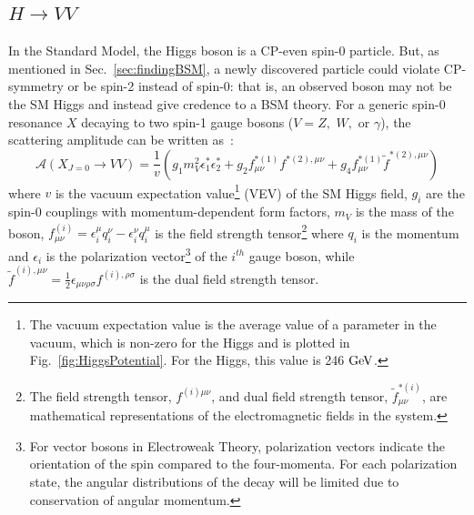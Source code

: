 \subsection{$H\rightarrow VV$}
\label{sec:HVVDecay}

In the Standard Model, the Higgs boson is a CP-even spin-0 particle. But, as mentioned in Sec.~\ref{sec:findingBSM}, a newly discovered particle could violate CP-symmetry or be spin-2 instead of spin-0: that is, an observed boson may not be the SM Higgs and instead give credence to a BSM theory. For a generic spin-0 resonance $X$ decaying to two spin-1 gauge bosons ($V=Z,$ $W,$ or $\gamma$), the scattering amplitude can be written as~\cite{Anderson:2013aa}:
\begin{equation}
  \mathcal{A}(X_{J=0} \rightarrow VV) = \frac{1}{v}\left(g_1m_V^2\epsilon_1^*\epsilon_2^*+g_2f_{\mu\nu}^{*(1)}f^{*(2),\mu\nu}+g_4f_{\mu\nu}^{*(1)}\tilde{f}^{*(2),\mu\nu}\right)
\label{eq:scalarAmp_gform}
\end{equation}
where $v$ is the vacuum expectation value\footnote{The vacuum expectation value is the average value of a parameter in the vacuum, which is non-zero for the Higgs and is plotted in Fig.~\ref{fig:HiggsPotential}. For the Higgs, this value is 246 $\rm{GeV}$.} (VEV) of the SM Higgs field, $g_i$ are the spin-0 couplings with momentum-dependent form factors, $m_V$ is the mass of the boson, $f_{\mu\nu}^{(i)}=\epsilon_i^\mu q_i^\nu - \epsilon_i^\nu q_i^\mu$ is the field strength tensor\footnote{The field strength tensor, $f^{(i)\mu\nu}$, and dual field strength tensor, $\tilde{f}^{*(i)}_{\mu\nu}$, are mathematical representations of the electromagnetic fields in the system.} where $q_i$ is the momentum and $\epsilon_i$ is the polarization vector\footnote{For vector bosons in Electroweak Theory, polarization vectors indicate the orientation of the spin compared to the four-momenta. For each polarization state, the angular distributions of the decay will be limited due to conservation of angular momentum.} of the $i^{th}$ gauge boson, while $\tilde{f}^{(i),\mu\nu}=\frac{1}{2}\epsilon_{\mu\nu\rho\sigma}f^{(i),\rho\sigma}$ is the dual field strength tensor.

